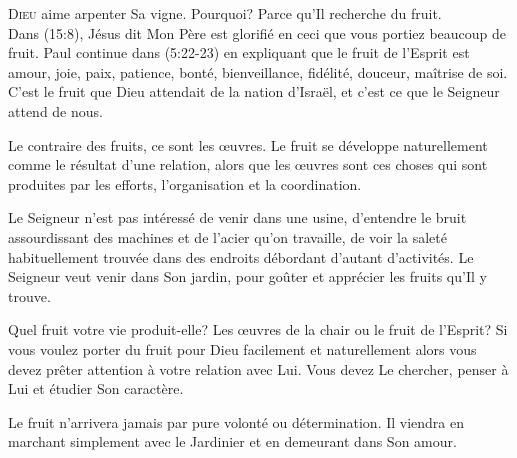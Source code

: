 \dvrule







\lettrine{D}{ieu} aime arpenter Sa vigne.
 Pourquoi? Parce qu'Il recherche du fruit. \\[1ex]
Dans (15:8), Jésus dit\frcolon{} 
 \Og Mon Père est glorifié en ceci\frcolon{} que vous portiez beaucoup de fruit. \Fg{}
 Paul continue dans (5:22-23) en expliquant que le fruit
 de l'Esprit est \Og amour, joie, paix, patience, bonté, bienveillance,
 fidélité, douceur, maîtrise de soi. \Fg{}
 C'est le fruit que Dieu attendait de la nation d'Israël,
 et c'est ce que le Seigneur attend de nous.


Le contraire des fruits, ce sont les \oe{}uvres.
 Le fruit se développe naturellement comme le résultat d'une relation,
 alors que les \oe{}uvres sont ces choses qui sont produites par les efforts,
 l'organisation et la coordination.

Le Seigneur n'est pas intéressé de venir dans une usine,
 d'entendre le bruit assourdissant des machines et de l'acier qu'on travaille,
 de voir la saleté habituellement trouvée dans des endroits
 débordant d'autant  d'activités.
 Le Seigneur veut venir dans Son jardin, pour goûter et apprécier
 les fruits qu'Il y trouve.

Quel fruit votre vie produit-elle? Les \oe{}uvres de la chair
 ou le fruit de l'Esprit? Si vous voulez porter du fruit pour Dieu
 \ocadr facilement et naturellement \fcadr{} alors vous devez prêter
 attention à votre relation avec Lui. Vous devez Le chercher,
 penser à Lui et étudier Son caractère.

Le fruit n'arrivera jamais par pure volonté ou détermination.
 Il viendra en marchant simplement avec le Jardinier
 et en demeurant dans Son amour.

